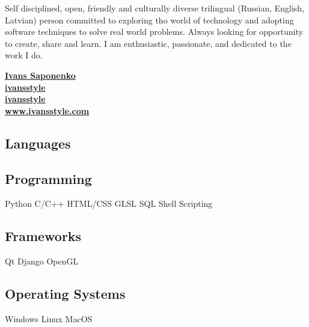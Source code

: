 \documentclass[a4paper]{MagicalCV}
\begin{document}
\lastupdated


\begin{minipage}[t]{0.49\textwidth}

 Self disciplined,
 open, friendly and culturally diverse trilingual (Russian, English, Latvian)
 person committed to exploring tho world of technology and adopting software techniques to solve real world problems.
 Always looking for opportunity to create, share and learn.
 I am enthusiastic, passionate, and dedicated to the work I do.


\begin{tabbing}
  \= \href{https://www.linkedin.com/in/ivanssaponenko/}{\bf Ivans Saponenko} \\
  \> \href{https://github.com/ivansstyle}{\bf ivansstyle} \\
  \> \href{https://www.vimeo.com/ivansstyle}{\bf ivansstyle} \\
  \> \href{https://www.ivansstyle.com}{\bf www.ivansstyle.com}
\end{tabbing}

 \vspace{0.1cm}
 \sectionsep
{}

 \subsection{Languages}
  

\subsection{Programming}
Python \textbullet{}  C/C++ \textbullet{} HTML/CSS  \textbullet{}
GLSL \textbullet{} SQL \textbullet{} Shell Scripting
 \subsection{Frameworks}
 Qt \textbullet{} Django \textbullet{} OpenGL
 \sectionsep
 \subsection{Operating Systems}
 Windows \textbullet{} Linux \textbullet{} MacOS
 \sectionsep

\end{minipage}
\end{document}
